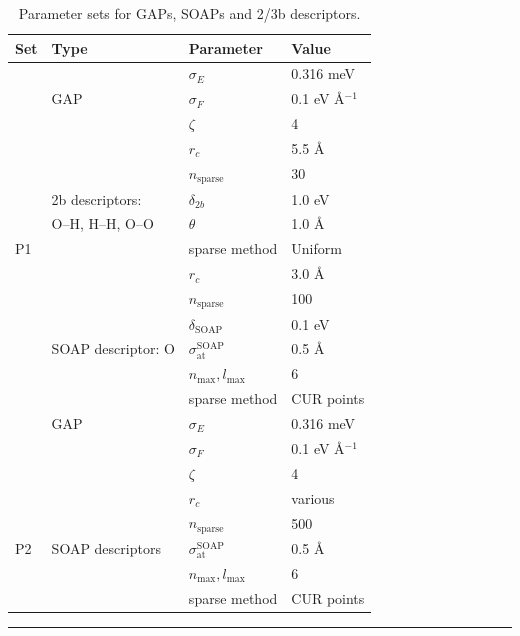 \documentclass[../../main.tex]{subfiles}
\begin{document}
\begin{table}[h!]
	\def\arraystretch{1.5}
	\begin{tabularx}{\textwidth}{YYYY}
		\hline
		Set	   &Type&	Parameter	&Value\\
		\hline
		
		&        	&$\sigma_E$	&0.316 meV
\\
	   &GAP   & $\sigma_F$	&0.1 eV \AA${}^{-1}$
\\
	    &           & $\zeta$    &  	4
\\
	    &	       &   $r_c$	&  5.5 \AA \\
	   &                 & $n_\text{sparse}$&	30
\\
	    &2b descriptors: & $\delta_{2b}$ &	1.0 eV
\\
      	& O--H, H--H, O--O   &$\theta$	    & 1.0 \AA  \\
	P1 &                        &sparse method	& Uniform
\\

         &							& $r_c$&3.0 \AA\\
        &						& $n_\text{sparse}$ &100\\
		&						&  $\delta_\text{SOAP}$&0.1 eV\\
		&SOAP descriptor: O&$\sigma_\text{at}^\text{SOAP}$&0.5 \AA\\
		&&$n_\text{max}, l_\text{max}$& 6 \\
	    &                      &  sparse method	    & CUR points
 \\
	 \hline
	    &	 GAP	   &  $\sigma_E$	&        0.316 meV  \\
        &	               &   $\sigma_F$	&  	0.1 eV \AA${}^{-1}$
 \\
	     &                  & $\zeta$         & 	4
  \\
	    &                   &	$r_c$	             & various
\\
     	&                  & $n_\text{sparse}$	       &500
\\
	P2 &SOAP descriptors  &$\sigma_\text{at}^\text{SOAP}$	&0.5 \AA
\\
	    &                   &$n_\text{max}, l_\text{max}$&6
\\
	   &                    &sparse method	&CUR points
	\end{tabularx}
	\hrule
	\caption{Parameter sets for GAPs, SOAPs and 2/3b descriptors.}
	\label{table::ml_si_1}
\end{table}
\end{document}
